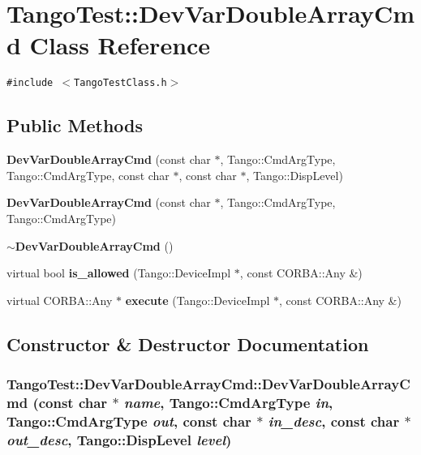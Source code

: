 \section{Tango\-Test::Dev\-Var\-Double\-Array\-Cmd  Class Reference}
\label{classTangoTest_1_1DevVarDoubleArrayCmd}
{\tt \#include $<$Tango\-Test\-Class.h$>$}

\subsection*{Public Methods}
\begin{CompactItemize}
\item 
{\bf Dev\-Var\-Double\-Array\-Cmd} (const char $\ast$, Tango::Cmd\-Arg\-Type, Tango::Cmd\-Arg\-Type, const char $\ast$, const char $\ast$, Tango::Disp\-Level)
\item 
{\bf Dev\-Var\-Double\-Array\-Cmd} (const char $\ast$, Tango::Cmd\-Arg\-Type, Tango::Cmd\-Arg\-Type)
\item 
{\bf $\sim$Dev\-Var\-Double\-Array\-Cmd} ()
\item 
virtual bool {\bf is\_\-allowed} (Tango::Device\-Impl $\ast$, const CORBA::Any \&)
\item 
virtual CORBA::Any $\ast$ {\bf execute} (Tango::Device\-Impl $\ast$, const CORBA::Any \&)
\end{CompactItemize}


\subsection{Constructor \& Destructor Documentation}
\subsubsection{\setlength{\rightskip}{0pt plus 5cm}Tango\-Test::Dev\-Var\-Double\-Array\-Cmd::Dev\-Var\-Double\-Array\-Cmd (const char $\ast$ {\em name}, Tango::Cmd\-Arg\-Type {\em in}, Tango::Cmd\-Arg\-Type {\em out}, const char $\ast$ {\em in\_\-desc}, const char $\ast$ {\em out\_\-desc}, Tango::Disp\-Level {\em level})}\label{classTangoTest_1_1DevVarDoubleArrayCmd_a0}



